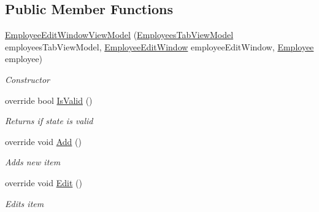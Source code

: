 \subsection*{Public Member Functions}
\begin{DoxyCompactItemize}
\item 
\hyperlink{class_baudi_1_1_client_1_1_view_models_1_1_edit_window_view_models_1_1_employee_edit_window_view_model_afbd66ab02712fc635cf52fb6e7927823}{Employee\+Edit\+Window\+View\+Model} (\hyperlink{class_baudi_1_1_client_1_1_view_models_1_1_tabs_view_models_1_1_employees_tab_view_model}{Employees\+Tab\+View\+Model} employees\+Tab\+View\+Model, \hyperlink{class_baudi_1_1_client_1_1_view_1_1_edit_windows_1_1_employee_edit_window}{Employee\+Edit\+Window} employee\+Edit\+Window, \hyperlink{class_baudi_1_1_d_a_l_1_1_models_1_1_employee}{Employee} employee)
\begin{DoxyCompactList}\small\item\em Constructor \end{DoxyCompactList}\item 
override bool \hyperlink{class_baudi_1_1_client_1_1_view_models_1_1_edit_window_view_models_1_1_employee_edit_window_view_model_a13a345a4c410f06daf9079520a31d5f6}{Is\+Valid} ()
\begin{DoxyCompactList}\small\item\em Returns if state is valid \end{DoxyCompactList}\item 
override void \hyperlink{class_baudi_1_1_client_1_1_view_models_1_1_edit_window_view_models_1_1_employee_edit_window_view_model_a4ad2dbbd993ae6edc9748f26c46add4a}{Add} ()
\begin{DoxyCompactList}\small\item\em Adds new item \end{DoxyCompactList}\item 
override void \hyperlink{class_baudi_1_1_client_1_1_view_models_1_1_edit_window_view_models_1_1_employee_edit_window_view_model_afadd6c5b30e7601cdc3b151637d6b16a}{Edit} ()
\begin{DoxyCompactList}\small\item\em Edits item \end{DoxyCompactList}\end{DoxyCompactItemize}
